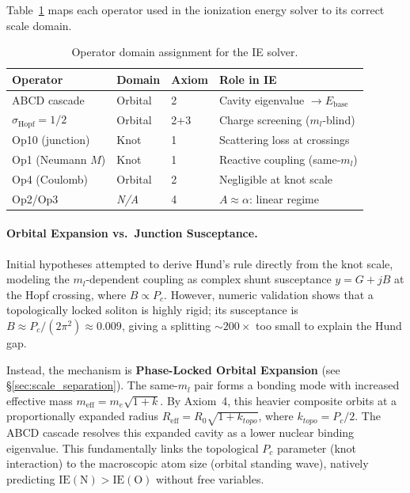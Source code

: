 Table~\ref{tab:operator_domain} maps each operator used in the
ionization energy solver to its correct scale domain.

\begin{table}[h!]
\centering
\caption{Operator domain assignment for the IE solver.}
\label{tab:operator_domain}
\small
\begin{tabular}{llll}
\toprule
\textbf{Operator}  & \textbf{Domain}  & \textbf{Axiom} & \textbf{Role in IE} \\
\midrule
ABCD cascade       & Orbital          & 2              & Cavity eigenvalue $\to E_{\text{base}}$ \\
$\sigma_{\text{Hopf}} = 1/2$ & Orbital & 2+3            & Charge screening ($m_l$-blind) \\
Op10 (junction)    & Knot             & 1              & Scattering loss at crossings \\
Op1 (Neumann $M$)  & Knot             & 1              & Reactive coupling (same-$m_l$) \\
Op4 (Coulomb)      & Orbital          & 2              & Negligible at knot scale \\
Op2/Op3            & \emph{N/A}       & 4              & $A \approx \alpha$: linear regime \\
\bottomrule
\end{tabular}
\end{table}

\paragraph{Orbital Expansion vs.~Junction Susceptance.}
Initial hypotheses attempted to derive Hund's rule directly from the
knot scale, modeling the $m_l$-dependent coupling as complex shunt
susceptance $y = G + jB$ at the Hopf crossing, where $B \propto P_c$.
However, numeric validation shows that a topologically locked soliton
is highly rigid; its susceptance is $B \approx P_c / (2\pi^2) \approx 0.009$,
giving a splitting $\sim 200\times$ too small to explain the Hund gap.

Instead, the mechanism is \textbf{Phase-Locked Orbital Expansion}
(see \S\ref{sec:scale_separation}). The same-$m_l$ pair forms a bonding
mode with increased effective mass $m_{\text{eff}} = m_e\sqrt{1+k}$.
By Axiom~4, this heavier composite orbits at a proportionally expanded
radius $R_{\text{eff}} = R_0 \sqrt{1+k_{topo}}$, where $k_{topo} = P_c/2$.
The ABCD cascade resolves this expanded cavity as a lower nuclear binding
eigenvalue. This fundamentally links the topological $P_c$ parameter
(knot interaction) to the macroscopic atom size (orbital standing wave),
natively predicting $\text{IE}(\text{N}) > \text{IE}(\text{O})$ without free variables.


